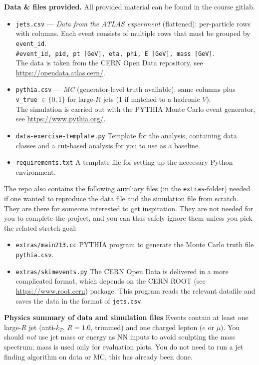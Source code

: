 \documentclass[11pt]{article}
\begin{document}
\vspace{0.75em}
\noindent\textbf{Data \& files provided.}
All provided material can be found in the course gitlab.
\begin{itemize}
  \item \texttt{jets.csv} --- \emph{Data from the ATLAS experiment} (flattened): per-particle rows with columns. Each event consists of multiple rows that must be grouped by \texttt{event\_id}.\\
  \small\texttt{\#event\_id, pid, pt [GeV], eta, phi, E [GeV], mass [GeV]}.\\
  The data is taken from the CERN Open Data repository, see \url{https://opendata.atlas.cern/}.
  \item \texttt{pythia.csv} --- \emph{MC} (generator-level truth available): same columns plus\\
  \small\texttt{v\_true} $\in \{0,1\}$ for large-$R$ jets (1 if matched to a hadronic $V$).\\
  The simulation is carried out with the PYTHIA Monte Carlo event generator, see \url{https://www.pythia.org/}.
  \item \texttt{data-exercise-template.py} Template for the analysis, containing data classes and a cut-based analysis for you to use as a baseline.
  \item \texttt{requirements.txt} A template file for setting up the neccesary Python environment.
\end{itemize}
The repo also contains the following auxiliary files (in the \texttt{extras}-folder) needed if one wanted to reproduce the data file and the simulation file from scratch. They are there for someone interested to get inspiration. They are not needed for you to complete the project, and you can thus safely ignore them unless you pick the related stretch goal:
\begin{itemize}
  \item \texttt{extras/main213.cc} PYTHIA program to generate the Monte Carlo truth file \texttt{pythia.csv}.
  \item \texttt{extras/skimevents.py} The CERN Open Data is delivered in a more complicated format, which depends on the CERN ROOT (see \url{https://www.root.cern}) package. This program reads the relevant datafile and saves the data in the format of \texttt{jets.csv}.
\end{itemize}

\noindent\textbf{Physics summary of data and simulation files}
Events contain at least one large-$R$ jet (anti-$k_T$, $R{=}1.0$, trimmed) and one charged lepton ($e$ or $\mu$). You should \emph{not} use jet mass or energy as NN inputs to avoid sculpting the mass spectrum; mass is used only for evaluation plots. You do not need to run a jet finding algorithm on data or MC, this has already been done.
\end{document}
